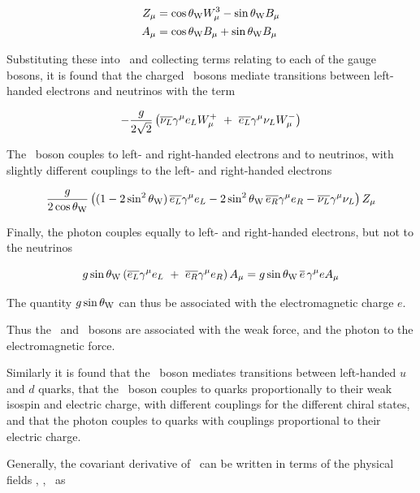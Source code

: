 \begin{align}
Z_{\mu} & = \cos{\ensuremath{\theta_{\mathrm{W}}}} W^{3}_{\mu} - \sin{\ensuremath{\theta_{\mathrm{W}}}} B_{\mu} \\
A_{\mu} & = \cos{\ensuremath{\theta_{\mathrm{W}}}} B_{\mu} + \sin{\ensuremath{\theta_{\mathrm{W}}}} B_{\mu}
\end{align}

Substituting these into~ and collecting terms
relating to each of the gauge bosons, it is found that the
charged \Wpm\ bosons mediate transitions between left-handed electrons and
neutrinos with the term

\begin{equation}
- \frac{g}{2\sqrt{2}} \left( \overline{\nu_{L}} \gamma^{\mu} e_{L} W^{+}_{\mu}
\ + \  \overline{e_{L}} \gamma^{\mu} \nu_{L} W^{-}_{\mu} \right)
\end{equation}

The \Z\ boson couples to left- and right-handed electrons and to
neutrinos, with slightly different couplings to the left- and right-handed
electrons

\begin{equation}
\frac{g}{2 \cos{\ensuremath{\theta_{\mathrm{W}}}}} \left( 
(1 - 2 \sin^{2}{\theta_{\mathrm{W}}})\, \overline{e_{L}} \gamma^{\mu} e_{L}  - 2 \sin^{2}{\theta_{\mathrm{W}}}\, \overline{e_{R}} \gamma^{\mu} e_{R} 
- \overline{\nu_{L}} \gamma^{\mu} \nu_{L} 
\right)Z_{\mu}
\end{equation}

Finally, the photon couples equally to left- and right-handed electrons, but not to the
neutrinos

\begin{equation}
g \sin{\ensuremath{\theta_{\mathrm{W}}}} \left( \overline{e_{L}} \gamma^{\mu} e_{L} 
\ + \ \overline{e_{R}} \gamma^{\mu} e_{R} \right) A_{\mu}
 = g \sin{\ensuremath{\theta_{\mathrm{W}}}} \, \overline{e}\, \gamma^{\mu} e A_{\mu}
\end{equation}

The quantity $g \sin{\ensuremath{\theta_{\mathrm{W}}}}$ can thus be associated with the electromagnetic
charge $e$. 

Thus the \W\ and \Z\ bosons are associated with the weak force, and the photon
to the electromagnetic force. 

Similarly it is found that the \W\ boson mediates
transitions between left-handed $u$ and $d$ quarks, that the
\Z\ boson couples to quarks proportionally to their weak isospin and electric
charge, with different couplings for the different chiral states, and that the photon couples to
quarks with couplings proportional to their electric charge.

Generally, the covariant derivative of~ can be
written in terms of the physical fields \Wpmmu, \Zmu, \Amu\ as

